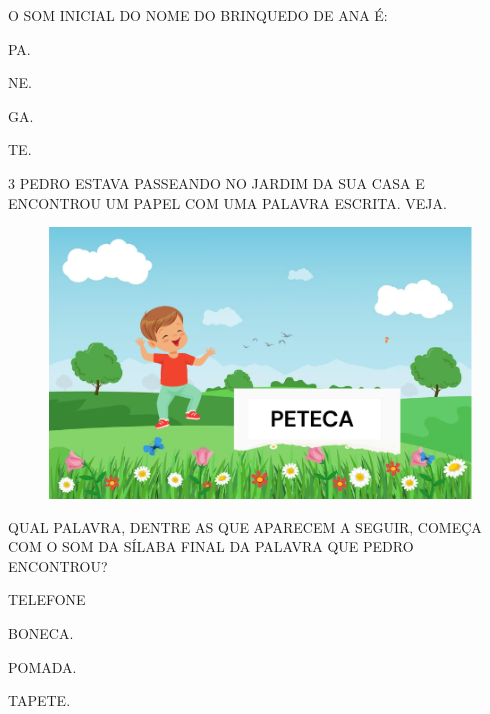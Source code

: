 O SOM INICIAL DO NOME DO BRINQUEDO DE ANA É:

\begin{escolha}
\item PA.

\item NE.

\item GA.

\item TE.
\end{escolha}


\num{3} PEDRO ESTAVA PASSEANDO NO JARDIM DA SUA CASA E ENCONTROU UM PAPEL COM UMA PALAVRA ESCRITA. VEJA.

\begin{figure}[htpb!]
\centering
\includegraphics[width=.8\textwidth]{media/image84.png}
\end{figure}


QUAL PALAVRA, DENTRE AS QUE APARECEM A SEGUIR, COMEÇA COM O SOM DA SÍLABA FINAL DA PALAVRA QUE PEDRO ENCONTROU?

\begin{escolha}
\item TELEFONE

\item BONECA.

\item POMADA.

\item TAPETE.
\end{escolha}


